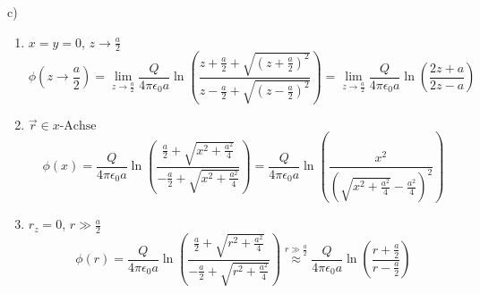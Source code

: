 \documentclass[11pt a4paper]{article}
\newcommand{\epsz}{\epsilon_0}
\begin{document}
\newpage
\setlength{\headheight}{0cm}
c)
\begin{enumerate}
	\item $x = y = 0$, $z \rightarrow \frac a 2$
		\[
			\phi(z \rightarrow \frac a2) =
			\lim_{z\rightarrow\frac a2} \frac{Q}
			{4\pi\epsz a} \ln\left(\frac{
				z + \frac a2 + \sqrt{\left(z+\frac a2
				\right)^2}}{
				z - \frac a2 + \sqrt{\left(z-\frac a2
				\right)^2}}
			\right)
		=
			\lim_{z\rightarrow\frac a2} \frac{Q}
			{4\pi\epsz a} \ln\left(\frac{2z + a}{2z -a }
			\right)
		\]
	\item $\vec r \in x\text{-Achse}$
	\[
		\phi(x) = \frac{Q}{4\pi\epsz a} \ln\left(\frac{
			\frac a2 + \sqrt{x^2 + \frac{a^2}4}}{
			-\frac a2 + \sqrt{x^2 + \frac{a^2}4}}\right)
		=
		\frac{Q}{4\pi \epsz a} \ln\left(\frac{
			x^2}{\left(\sqrt{x^2 + \frac{a^2}{4}} - 
			\frac{a^2}{4}\right)^2} \right)
			\]
	\item $r_z = 0$, $r \gg \frac a2$
		\[
			\phi(r) = \frac{Q}{4\pi\epsz a} \ln\left(\frac{
				\frac a2 + \sqrt{r^2 + \frac{a^2}{4}}}{
				-\frac a2 + \sqrt{r^2 + \frac{a^2}{4}}}
			\right)
			\overset{r \gg \frac a2}{\approx}
			\frac{Q}{4\pi\epsz a} \ln\left(\frac{
				r + \frac a 2}{r - \frac a2}\right)
		\]
\end{enumerate}

\newpage
\setlength{\headheight}{0cm}
\end{document}
